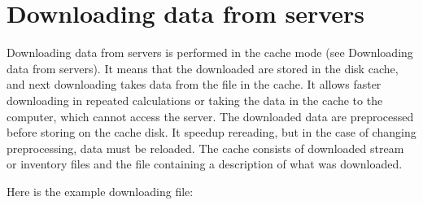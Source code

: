 \documentclass[letterpaper,10pt,english]{sphinxmanual}
\begin{document}
\section{Downloading data from servers}
\label{\detokenize{io_data:downloading-data-from-servers}}
\sphinxAtStartPar
Downloading data from servers is performed in the cache mode
(see Downloading data from servers).
It means that the downloaded are stored in the disk cache, and next downloading
takes data from the file in the cache. It allows faster downloading in repeated calculations
or taking the data in the cache to the computer, which cannot access the server.
The downloaded data are preprocessed before storing on the cache disk. It speedup rereading,
but in the case of changing preprocessing, data must be reloaded.
The cache consists of downloaded stream or inventory files
and the file containing a description of what was downloaded.

\sphinxAtStartPar
Here is the example downloading file:
\end{document}
